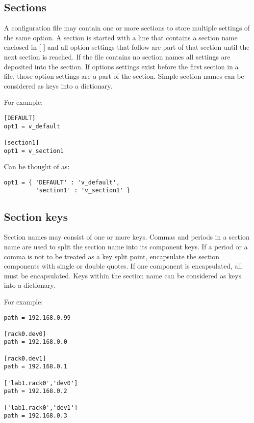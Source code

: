 \documentclass{howto}
\begin{document}
\subsection{Sections\label{cfgparse-sections}}

A configuration file may contain one or more sections to store
multiple settings of the same option.  A section is started with a 
line that contains a section name enclosed in [ ] and all option settings
that follow are part of that section until the next section is reached.  
If the file contains no section names all settings are deposited into
the \code{[DEFAULT]} section.  If options settings exist before the first
section in a file, those option settings are a part of the \code{[DEFAULT]}
section.  Simple section names can be considered as keys into a dictionary.

For example:

\begin{verbatim}
[DEFAULT]
opt1 = v_default

[section1]
opt1 = v_section1
\end{verbatim}

Can be thought of as:

\begin{verbatim}
opt1 = { 'DEFAULT' : 'v_default',
         'section1' : 'v_section1' }
\end{verbatim}

\subsection{Section keys\label{cfgparse-section-keys}}

Section names may consist of one or more keys.  Commas and periods in a
section name are used to split the section name into its component keys.
If a period or a comma is not to be treated as a key split point,
encapsulate the section components with single
or double quotes.  If one component is encapsulated, all must be
encapsulated.  Keys within the section name can be considered as
keys into a dictionary.

For example:

\begin{verbatim}
path = 192.168.0.99

[rack0.dev0]
path = 192.168.0.0

[rack0.dev1]
path = 192.168.0.1

['lab1.rack0','dev0']
path = 192.168.0.2

['lab1.rack0','dev1']
path = 192.168.0.3
\end{verbatim}
\end{document}
